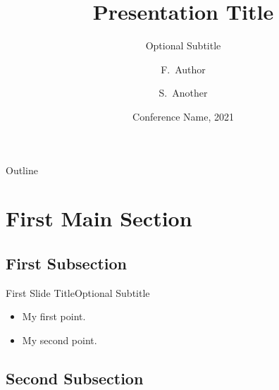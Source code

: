 \documentclass[
  UTF8, %
  aspectratio=43, %
  11pt, %
]{presentation}
\title{Presentation Title}
\subtitle{Optional Subtitle}
\author{F.~Author\inst{1} \and S.~Another\inst{2}}
\institute[Universities of Somewhere and Elsewhere] %
{
  \inst{1}
  Department of Computer Science \\
  University of Somewhere
  \and
  \inst{2}
  Department of Theoretical Philosophy \\
  University of Elsewhere
}
\date{Conference Name, 2021}
\begin{document}
{

  \begin{frame}
    \titlepage
  \end{frame}
}

\begin{frame}{Outline}
  \tableofcontents
\end{frame}


\section{First Main Section}

\subsection{First Subsection}

\begin{frame}{First Slide Title}{Optional Subtitle}
  \begin{itemize}
    \item {
          My first point.
          }
    \item {
          My second point.
          }
  \end{itemize}
\end{frame}

\subsection{Second Subsection}
\end{document}
